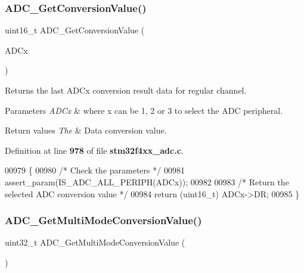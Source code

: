 \subsubsection{A\+D\+C\+\_\+\+Get\+Conversion\+Value()}
{\footnotesize\ttfamily uint16\+\_\+t A\+D\+C\+\_\+\+Get\+Conversion\+Value (\begin{DoxyParamCaption}\item[{\textbf{ A\+D\+C\+\_\+\+Type\+Def} $\ast$}]{A\+D\+Cx }\end{DoxyParamCaption})}



Returns the last A\+D\+Cx conversion result data for regular channel. 


\begin{DoxyParams}{Parameters}
{\em A\+D\+Cx} & where x can be 1, 2 or 3 to select the A\+DC peripheral. \\
\hline
\end{DoxyParams}

\begin{DoxyRetVals}{Return values}
{\em The} & Data conversion value. \\
\hline
\end{DoxyRetVals}


Definition at line \textbf{ 978} of file \textbf{ stm32f4xx\+\_\+adc.\+c}.


\begin{DoxyCode}
00979 \{
00980   \textcolor{comment}{/* Check the parameters */}
00981   assert_param(IS_ADC_ALL_PERIPH(ADCx));
00982   
00983   \textcolor{comment}{/* Return the selected ADC conversion value */}
00984   \textcolor{keywordflow}{return} (uint16\_t) ADCx->DR;
00985 \}
\end{DoxyCode}
\mbox{\label{group__ADC__Group4_ga989f4365b56be99999b8ec096aba2081}} 
\subsubsection{A\+D\+C\+\_\+\+Get\+Multi\+Mode\+Conversion\+Value()}
{\footnotesize\ttfamily uint32\+\_\+t A\+D\+C\+\_\+\+Get\+Multi\+Mode\+Conversion\+Value (\begin{DoxyParamCaption}\item[{void}]{ }\end{DoxyParamCaption})}



